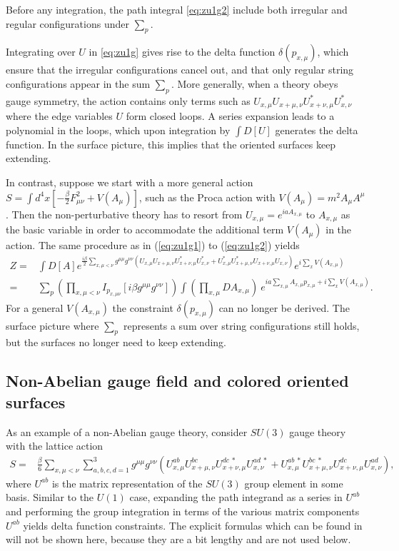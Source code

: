 \documentclass[12pt]{article}
\theoremstyle{definition}
\begin{document}
Before any integration, the path integral \eqref{eq:zu1g2} include both irregular and regular configurations under $\sum_p$.

Integrating over $U$ in \eqref{eq:zu1g} gives rise to the delta function $\delta(p_{x,\mu})$, which ensure that the irregular configurations cancel out, and that only regular string configurations appear in the sum $\sum_p$. More generally, when a theory obeys gauge symmetry, the action contains only terms such as $U_{x,\mu}U_{x+\mu,\nu} U_{x+\nu,\mu}^* U_{x,\nu}^* $ where the edge variables $U$ form closed loops. A series expansion leads to a polynomial in the loops, which upon integration by $\int D[U]$ generates the delta function. In the surface picture, this implies that the oriented surfaces keep extending.

In contrast, suppose we start with a more general action $S= \int d^4 x [-\frac{\beta}{2} F_{\mu\nu}^2+V(A_\mu)]$, such as the Proca action with $V(A_\mu)=m^2 A_\mu A^\mu$. Then the non-perturbative theory has to resort from $U_{x,\mu}=e^{iaA_{x,\mu}}$ to $A_{x,\mu}$ as the basic variable in order to accommodate the additional term $V(A_\mu)$ in the action. The same procedure as in (\ref{eq:zu1g1}) to (\ref{eq:zu1g2}) yields
\begin{align}
Z =& \int D[A] e^{\frac{i\beta}{2} \sum_{x, \mu<\nu} g^{\mu\mu} g^{\nu\nu} (U_{x,\mu}U_{x+\mu,\nu} U_{x+\nu,\mu}^* U_{x,\nu}^* + U_{x,\mu}^* U_{x+\mu,\nu}^* U_{x+\nu,\mu} U_{x,\nu})} e^{i\sum_{x} V(A_{x,\mu})}
\\=& \sum_{p}(\prod_{x,\mu<\nu} I_{p_{x,\mu\nu}}[i \beta g^{\mu\mu} g^{\nu\nu}]) \int (\prod_{x,\mu} D A_{x,\mu}) ~e^{i a \sum_{x,\mu} A_{x,\mu} p_{x,\mu}+i\sum_{x} V(A_{x,\mu})}.
\label{eq:zu1ng}
\end{align}
For a general $V(A_{x,\mu})$ the constraint $\delta(p_{x,\mu})$ can no longer be derived. The surface picture where $\sum_p$ represents a sum over string configurations still holds, but the surfaces no longer need to keep extending. 

\subsection{Non-Abelian gauge field and colored oriented surfaces}\label{sec:nabgcos}

As an example of a non-Abelian gauge theory, consider $SU(3)$ gauge theory with the lattice action
\begin{align}
S= & \frac{\beta}{6} \sum_{x, \mu<\nu} \sum_{a,b,c,d=1}^3 g^{\mu\mu} g^{\nu\nu} (U_{x,\mu}^{ab} U_{x+\mu,\nu}^{bc} U_{x+\nu,\mu}^{dc~*} U_{x,\nu}^{ad~*} + U_{x,\mu}^{ab~*} U_{x+\mu,\nu}^{bc~*} U_{x+\nu,\mu}^{dc} U_{x,\nu}^{ad}),
\label{eq:su3a}
\end{align}
where $U^{ab}$ is the matrix representation of the $SU(3)$ group element in some basis. Similar to the $U(1)$ case, expanding the path integrand as a series in $U^{ab}$ and performing the group integration in terms of the various matrix components $U^{ab}$ yields delta function constraints. The explicit formulas which can be found in \cite{Gattringer2018WorldlinesCycles, Marchis2018DualFluxes} will not be shown here, because they are a bit lengthy and are not used below.
\end{document}
